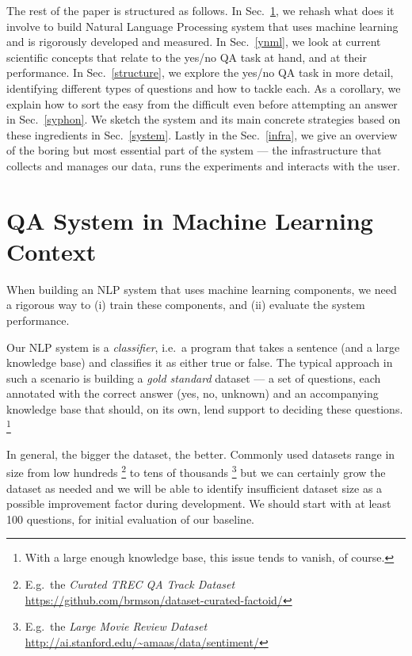 \documentclass[11pt,a4paper]{article}
\begin{document}
The rest of the paper is structured as follows.
In Sec.~\ref{qaml}, we rehash what does it involve to build Natural Language Processing
system that uses machine learning and is rigorously developed and measured.
In Sec.~\ref{ynml}, we look at current scientific concepts that relate
to the yes/no QA task at hand, and at their performance.
In Sec.~\ref{structure}, we explore the yes/no QA task in more detail,
identifying different types of questions and how to tackle each.
As a corollary, we explain how to sort the easy from the difficult
even before attempting an answer in Sec.~\ref{syphon}.
We sketch the system and its main concrete strategies based on these
ingredients in Sec.~\ref{system}.
Lastly in the Sec.~\ref{infra}, we give an overview of
the boring but most essential part of the system --- the infrastructure
that collects and manages our data, runs the experiments and interacts with the user.

\section{QA System in Machine Learning Context}
\label{qaml}

When building an NLP system that uses machine learning components,
we need a rigorous way to (i) train these components, and (ii) evaluate
the system performance.

Our NLP system is a \textit{classifier}, i.e.\ a program that takes
a sentence (and a large knowledge base) and classifies it as either
true or false.  The typical approach in such a scenario is building
a \textit{gold standard} dataset --- a set of questions, each annotated
with the correct answer (yes, no, unknown) and an accompanying knowledge
base that should, on its own, lend support to deciding these questions.%
\footnote{With a large enough knowledge base, this issue tends to vanish,
of course.}

In general, the bigger the dataset, the better.  Commonly used datasets
range in size from low hundreds%
\footnote{E.g.\ the \textit{Curated TREC QA Track Dataset} \url{https://github.com/brmson/dataset-curated-factoid/}}
to tens of thousands%
\footnote{E.g.\ the \textit{Large Movie Review Dataset} \url{http://ai.stanford.edu/~amaas/data/sentiment/}}
but we can certainly grow the dataset as needed and we will be able to identify
insufficient dataset size as a possible improvement factor during development.
We should start with at least 100 questions, for initial evaluation of our
baseline.
\end{document}
